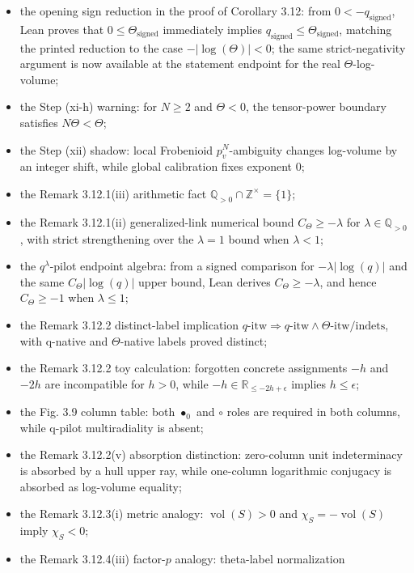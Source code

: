 \documentclass[11pt]{article}
\newcommand{\R}{\mathbb{R}}
\begin{document}
\begin{itemize}
  \(\Theta\)-subject/\(q\)-not-subject indeterminacy boundary is provided;
\item the opening sign reduction in the proof of Corollary 3.12:
  from \(0<-q_{\mathrm{signed}}\), Lean proves that
  \(0\le\Theta_{\mathrm{signed}}\) immediately implies
  \(q_{\mathrm{signed}}\le\Theta_{\mathrm{signed}}\), matching the printed
  reduction to the case \(-|\log(\Theta)|<0\); the same strict-negativity
  argument is now available at the statement endpoint for the real
  \(\Theta\)-log-volume;
\item the Step (xi-h) warning: for \(N\ge2\) and \(\Theta<0\), the tensor-power
  boundary satisfies \(N\Theta<\Theta\);
\item the Step (xii) shadow: local Frobenioid \(p_v^N\)-ambiguity changes
  log-volume by an integer shift, while global calibration fixes exponent \(0\);
\item the Remark 3.12.1(iii) arithmetic fact
  \(\mathbb{Q}_{>0}\cap\mathbb{Z}^{\times}=\{1\}\);
\item the Remark 3.12.1(ii) generalized-link numerical bound
  \(C_\Theta\ge-\lambda\) for \(\lambda\in\mathbb{Q}_{>0}\), with strict
  strengthening over the \(\lambda=1\) bound when \(\lambda<1\);
\item the \(q^\lambda\)-pilot endpoint algebra:
  from a signed comparison for \(-\lambda|\log(q)|\) and the same
  \(C_\Theta|\log(q)|\) upper bound, Lean derives \(C_\Theta\ge-\lambda\), and
  hence \(C_\Theta\ge-1\) when \(\lambda\le1\);
\item the Remark 3.12.2 distinct-label implication
  \(q\text{-itw}\Rightarrow q\text{-itw}\wedge\Theta\text{-itw}/\mathrm{indets}\),
  with q-native and \(\Theta\)-native labels proved distinct;
\item the Remark 3.12.2 toy calculation: forgotten concrete assignments
  \(-h\) and \(-2h\) are incompatible for \(h>0\), while
  \(-h\in\R_{\le-2h+\epsilon}\) implies \(h\le\epsilon\);
\item the Fig. 3.9 column table: both \(\bullet_0\) and \(\circ\) roles are
  required in both columns, while q-pilot multiradiality is absent;
\item the Remark 3.12.2(v) absorption distinction: zero-column unit
  indeterminacy is absorbed by a hull upper ray, while one-column logarithmic
  conjugacy is absorbed as log-volume equality;
\item the Remark 3.12.3(i) metric analogy:
  \(\operatorname{vol}(S)>0\) and \(\chi_S=-\operatorname{vol}(S)\) imply
  \(\chi_S<0\);
\item the Remark 3.12.4(iii) factor-\(p\) analogy: theta-label normalization

\end{itemize}
\end{document}
